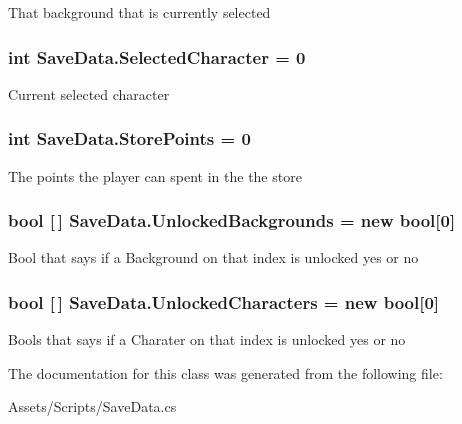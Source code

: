 That background that is currently selected 

\subsubsection[{\texorpdfstring{Selected\+Character}{SelectedCharacter}}]{\setlength{\rightskip}{0pt plus 5cm}int Save\+Data.\+Selected\+Character = 0}\hypertarget{class_save_data_a6f8a789b4a102c7ae5038ff8a8c86088}{}\label{class_save_data_a6f8a789b4a102c7ae5038ff8a8c86088}


Current selected character 

\subsubsection[{\texorpdfstring{Store\+Points}{StorePoints}}]{\setlength{\rightskip}{0pt plus 5cm}int Save\+Data.\+Store\+Points = 0}\hypertarget{class_save_data_a96bd1137583a956bca2e7bd26cd11f89}{}\label{class_save_data_a96bd1137583a956bca2e7bd26cd11f89}


The points the player can spent in the the store 

\subsubsection[{\texorpdfstring{Unlocked\+Backgrounds}{UnlockedBackgrounds}}]{\setlength{\rightskip}{0pt plus 5cm}bool \mbox{[}$\,$\mbox{]} Save\+Data.\+Unlocked\+Backgrounds = new bool\mbox{[}0\mbox{]}}\hypertarget{class_save_data_a6989ed440d66cee33ae1a8501af3d1be}{}\label{class_save_data_a6989ed440d66cee33ae1a8501af3d1be}


Bool that says if a Background on that index is unlocked yes or no 

\subsubsection[{\texorpdfstring{Unlocked\+Characters}{UnlockedCharacters}}]{\setlength{\rightskip}{0pt plus 5cm}bool \mbox{[}$\,$\mbox{]} Save\+Data.\+Unlocked\+Characters = new bool\mbox{[}0\mbox{]}}\hypertarget{class_save_data_af0386c50f7a6c086d961118aa6f80b24}{}\label{class_save_data_af0386c50f7a6c086d961118aa6f80b24}


Bools that says if a Charater on that index is unlocked yes or no 



The documentation for this class was generated from the following file\+:\begin{DoxyCompactItemize}
\item 
Assets/\+Scripts/Save\+Data.\+cs\end{DoxyCompactItemize}
